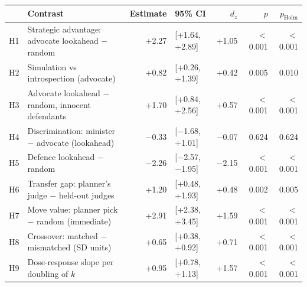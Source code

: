 \begin{tabular}{@{}llrlrrr@{}}\toprule
 & Contrast & Estimate & 95\% CI & $d_z$ & $p$ & $p_{\text{Holm}}$\\\midrule
H1 & Strategic advantage: advocate lookahead $-$ random & +2.27 & [+1.64, +2.89] & +1.05 & \ensuremath{<}0.001 & \ensuremath{<}0.001\\
H2 & Simulation vs introspection (advocate) & +0.82 & [+0.26, +1.39] & +0.42 & 0.005 & 0.010\\
H3 & Advocate lookahead $-$ random, innocent defendants & +1.70 & [+0.84, +2.56] & +0.57 & \ensuremath{<}0.001 & \ensuremath{<}0.001\\
H4 & Discrimination: minister $-$ advocate (lookahead) & \ensuremath{-}0.33 & [\ensuremath{-}1.68, +1.01] & \ensuremath{-}0.07 & 0.624 & 0.624\\
H5 & Defence lookahead $-$ random & \ensuremath{-}2.26 & [\ensuremath{-}2.57, \ensuremath{-}1.95] & \ensuremath{-}2.15 & \ensuremath{<}0.001 & \ensuremath{<}0.001\\
H6 & Transfer gap: planner's judge $-$ held-out judges & +1.20 & [+0.48, +1.93] & +0.48 & 0.002 & 0.005\\
H7 & Move value: planner pick $-$ random (immediate) & +2.91 & [+2.38, +3.45] & +1.59 & \ensuremath{<}0.001 & \ensuremath{<}0.001\\
H8 & Crossover: matched $-$ mismatched (SD units) & +0.65 & [+0.38, +0.92] & +0.71 & \ensuremath{<}0.001 & \ensuremath{<}0.001\\
H9 & Dose-response slope per doubling of $k$ & +0.95 & [+0.78, +1.13] & +1.57 & \ensuremath{<}0.001 & \ensuremath{<}0.001\\
\bottomrule\end{tabular}
